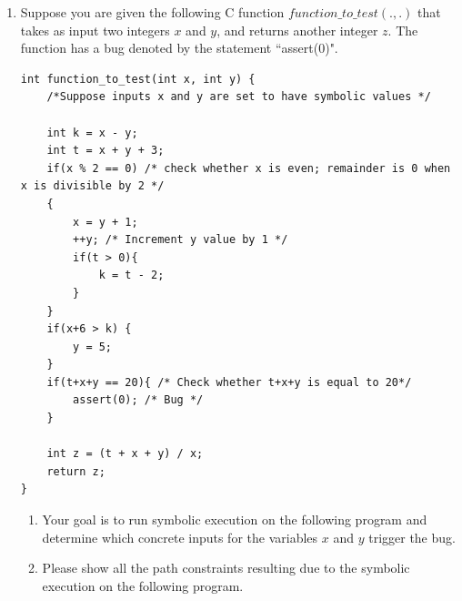\documentclass[12pt,a4paper]{article}
\begin{document}
\begin{enumerate}
\color{blue}

\color{black}

\item Suppose you are given the following C function $function\_to\_test (.,.)$ that
takes as input two integers $x$ and $y$, and returns another integer $z$. The function has a
bug denoted by the statement ``assert(0)".


\begin{lstlisting} 
int function_to_test(int x, int y) {
	/*Suppose inputs x and y are set to have symbolic values */
	
	int k = x - y;
	int t = x + y + 3;
	if(x % 2 == 0) /* check whether x is even; remainder is 0 when x is divisible by 2 */
	{
		x = y + 1;
		++y; /* Increment y value by 1 */
		if(t > 0){
			k = t - 2;
		}
	}	
	if(x+6 > k) {
		y = 5;
	}
	if(t+x+y == 20){ /* Check whether t+x+y is equal to 20*/
		assert(0); /* Bug */
	}
	
	int z = (t + x + y) / x; 
	return z;
}
\end{lstlisting}

\begin{enumerate}
\item Your goal is to run symbolic execution on the following program and determine which concrete inputs for the variables $x$ and $y$ trigger the bug.

\color{blue}

\color{black}

\item Please show all the path constraints resulting due to the symbolic execution on the following program.


\end{enumerate}
\end{enumerate}
\end{document}
